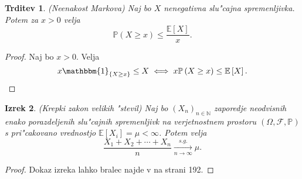 \documentclass[12pt, a4paper, reqno]{amsart}
\theoremstyle{definition}
\newtheorem{definicija}{Definicija}[section]
\theoremstyle{plain}
\newtheorem{izrek}[definicija]{Izrek}
\newtheorem{trditev}[definicija]{Trditev}
\newcommand{\R}{\mathbb{R}}
\newcommand{\N}{\mathbb{N}}
\newcommand{\E}{\mathbb{E}}
\newcommand{\Prob}{\mathbb{P}}
\newcommand{\1}{\mathds{1}}
\begin{document}
    \begin{trditev}(Neenakost Markova)
        \label{trd:neenakostMarkova}
        Naj bo $X$ nenegativna slu"cajna spremenljivka.
        Potem za  $x>0$ velja
        \begin{equation*}
            \Prob\left(X \geq x\right) \leq \frac{\E\left[X\right]}{x}.
        \end{equation*}
    \end{trditev}

    \begin{proof}
        Naj bo $x > 0$. Velja
        \begin{equation*}
            x\mathbbm{1}_{\{X \geq x\}} \leq X \iff x\Prob\left(X \geq x\right) \leq \E\left[X\right].
        \end{equation*}
    \end{proof}


    \begin{izrek}(Krepki zakon velikih "stevil)
        Naj bo $(X_n)_{n\in\N}$ zaporedje neodvisnih enako porazdeljenih
        slu"cajnih spremenljivk na verjetnostnem prostoru $(\Omega, \mathcal{F}, \Prob)$
         s pri"cakovano vrednostjo $\E\left[X_i\right] = \mu <\infty$. Potem velja
        \begin{equation*}
            \frac{X_1 + X_2 + \cdots + X_n}{n}\xrightarrow[n\to\infty]{s.g.} \mu.
        \end{equation*}
        \label{izr:KrepkiZakonVelikihStevil}
    \end{izrek}

    \begin{proof}
        Dokaz izreka lahko bralec najde v \cite{7} na strani 192.
    \end{proof}
\end{document}
